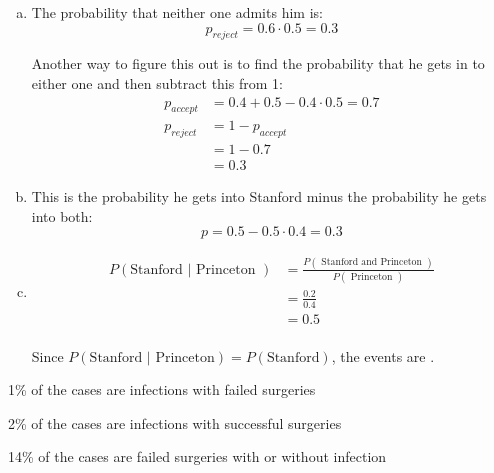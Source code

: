 \documentclass[letterpaper, landscape]{exam}
\begin{document}
\begin{description}
\begin{enumerate}[(a)]
      \end{enumerate}

    \item[31]
      \begin{enumerate}[(a)]
        \item The probability that neither one admits him is:
          \[
            p_{reject} = 0.6 \cdot 0.5 = \boxed{ 0.3 }
          \]

          Another way to figure this out is to find the probability that he
          gets in to either one and then subtract this from 1:
          \begin{align*}
            p_{accept} & = 0.4 + 0.5 - 0.4 \cdot 0.5 = 0.7 \\
            p_{reject} & = 1 - p_{accept} \\
                       & = 1 - 0.7 \\
                       & = 0.3
          \end{align*}

        \item
          This is the probability he gets into Stanford minus the probability
          he gets into both:
          \[
            p = 0.5 - 0.5 \cdot 0.4 = \boxed{ 0.3 }
          \]
          
        \item 
          \begin{align*}
            P( \text{Stanford } | \text{ Princeton } ) & = \frac{ P(\text{ Stanford and Princeton }) }{ P(\text{ Princeton }) } \\
                                                       & = \frac{0.2}{0.4} \\
                                                       & = 0.5 \\
          \end{align*}

          Since $P(\text{Stanford } | \text{ Princeton}) = P(\text{Stanford})$, the events are .

      \end{enumerate}

    \item[32]
      \begin{enumerate*}
        \item 1\% of the cases are infections with failed surgeries
        \item 2\% of the cases are infections with successful surgeries
        \item 14\% of the cases are failed surgeries with or without infection
      \end{enumerate*}


\end{description}
\end{document}
